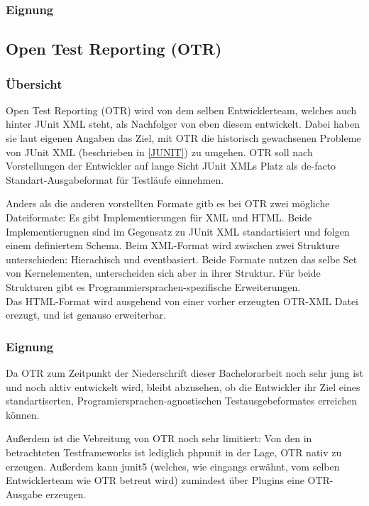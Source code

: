 \subsubsection{Eignung}

\subsection{Open Test Reporting (OTR)}
\subsubsection{Übersicht}
Open Test Reporting (OTR) wird von dem selben Entwicklerteam, welches auch hinter JUnit XML steht, als Nachfolger von eben diesem entwickelt. Dabei haben sie laut eigenen Angaben das Ziel, mit OTR die historisch gewachsenen Probleme von JUnit XML (beschrieben in \ref{JUNIT}) zu umgehen. OTR soll nach Vorstellungen der Entwickler auf lange Sicht JUnit XMLs Platz als de-facto Standart-Ausgabeformat für Testläufe einnehmen.

Anders als die anderen vorstellten Formate gitb es bei OTR zwei mögliche Dateiformate: Es gibt Implementierungen für XML und HTML. Beide Implementierugnen sind im Gegensatz zu JUnit XML standartisiert und folgen einem definiertem Schema. Beim XML-Format wird zwischen zwei Strukture unterschieden: Hierachisch und eventbasiert. Beide Formate nutzen das selbe Set von Kernelementen, unterscheiden sich aber in ihrer Struktur. Für beide Strukturen gibt es Programmiersprachen-spezifische Erweiterungen.\\
Das HTML-Format wird ausgehend von einer vorher erzeugten OTR-XML Datei erezugt, und ist genauso erweiterbar. 


\subsubsection{Eignung}
Da OTR zum Zeitpunkt der Niederschrift dieser Bachelorarbeit noch sehr jung ist und noch aktiv entwickelt wird, bleibt abzusehen, ob die Entwickler ihr Ziel eines standartiserten, Programiersprachen-agnostischen Testausgebeformates erreichen können.

Außerdem ist die Vebreitung von OTR noch sehr limitiert: Von den in  betrachteten Testframeworks ist lediglich phpunit in der Lage, OTR nativ zu erzeugen. Außerdem kann junit5 (welches, wie eingangs erwähnt, vom selben Entwicklerteam wie OTR betreut wird) zumindest über Plugins eine OTR-Ausgabe erzeugen.

